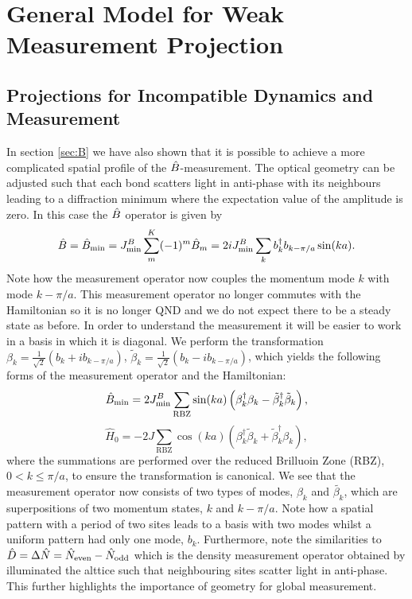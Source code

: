 \section{General Model for Weak Measurement Projection}

\subsection{Projections for Incompatible Dynamics and Measurement}

In section \ref{sec:B} we have also shown that it is possible to
achieve a more complicated spatial profile of the
$\hat{B}$-measurement. The optical geometry can be adjusted such that each
bond scatters light in anti-phase with its neighbours leading to a
diffraction minimum where the expectation value of the amplitude is
zero. In this case the $\hat{B}$ operator is given by
\begin{equation}
  \hat{B} = \hat{B}_\mathrm{min} = J^B_\mathrm{min} \sum_m^K (-1)^m \hat{B}_m
  = 2 i J^B_\mathrm{min} \sum_k b^\dagger_k b_{k - \pi/a} \sin(ka).
\end{equation}
Note how the measurement operator now couples the momentum mode $k$
with mode $k - \pi/a$. This measurement operator no longer commutes
with the Hamiltonian so it is no longer QND and we do not expect there
to be a steady state as before. In order to understand the measurement
it will be easier to work in a basis in which it is diagonal. We
perform the transformation
$\beta_k = \frac{1}{\sqrt{2}} \left( b_k + i b_{k - \pi/a} \right)$,
$\tilde{\beta}_k = \frac{1}{\sqrt{2}} \left( b_k - i b_{k - \pi/a}
\right)$, which yields the following forms of the measurement operator
and the Hamiltonian:
\begin{equation}
  \label{eq:BminBeta}
  \hat{B}_\mathrm{min} = 2 J^B_\mathrm{min} \sum_{\mathrm{RBZ}} \sin(ka) \left( \beta^\dagger_k
    \beta_k - \tilde{\beta}_k^\dagger \tilde{\beta}_k \right),
\end{equation}
\begin{equation}
  \label{eq:H0Beta}
  \hat{H}_0 = - 2 J \sum_{\mathrm{RBZ}} \cos(ka) \left( \beta_k^\dagger
    \tilde{\beta}_k + \tilde{\beta}^\dagger_k \beta_k \right),
\end{equation}
where the summations are performed over the reduced Brilluoin Zone
(RBZ), $0 < k \le \pi/a$, to ensure the transformation is
canonical. We see that the measurement operator now consists of two
types of modes, $\beta_k$ and $\tilde{\beta_k}$, which are
superpositions of two momentum states, $k$ and $k - \pi/a$. Note how a
spatial pattern with a period of two sites leads to a basis with two
modes whilst a uniform pattern had only one mode, $b_k$. Furthermore,
note the similarities to
$\hat{D} = \Delta \hat{N} = \hat{N}_\mathrm{even} - \hat{N}_\mathrm{odd}$
which is the density measurement operator obtained by illuminated the
alttice such that neighbouring sites scatter light in anti-phase. This
further highlights the importance of geometry for global measurement.

